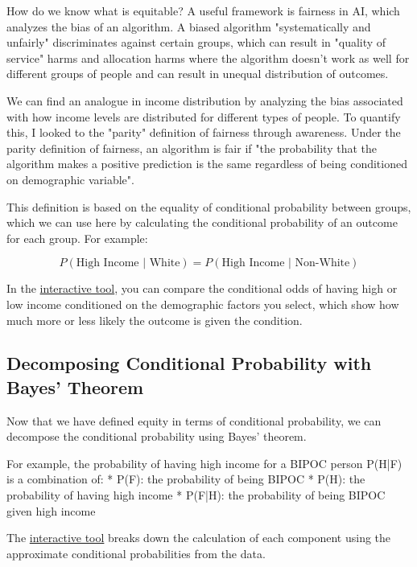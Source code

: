 \documentclass[12pt]{article}
\begin{document}
How do we know what is equitable? A useful framework is fairness in AI, which analyzes the bias of an algorithm. A biased algorithm "systematically and unfairly" discriminates against certain groups, which can result in "quality of service" harms and allocation harms where the algorithm doesn't work as well for different groups of people and can result in unequal distribution of outcomes.\cite{creel}

We can find an analogue in income distribution by analyzing the bias associated with how income levels are distributed for different types of people. To quantify this, I looked to the "parity" definition of fairness through awareness. Under the parity definition of fairness, an algorithm is fair if "the probability that the algorithm makes a positive prediction is the same regardless of being conditioned on demographic variable".\cite{piech:fair}

This definition is based on the equality of conditional probability between groups, which we can use here by calculating the conditional probability of an outcome for each group. For example:

$$P(\text{High Income | White}) = P(\text{High Income | Non-White})$$

In the \href{https://observablehq.com/d/b1dfcf5fca53a8b2#cell-1189}{interactive tool}, you can compare the conditional odds of having high or low income conditioned on the demographic factors you select, which show  how much more or less likely the outcome is given the condition.\cite[p.~70]{ross}

\subsection*{Decomposing Conditional Probability with Bayes' Theorem}

Now that we have defined equity in terms of conditional probability, we can decompose the conditional probability using Bayes' theorem.\cite{piech:bayes} 

For example, the probability of having high income for a BIPOC person P(H|F) is a combination of: 
* P(F): the probability of being BIPOC
* P(H): the probability of having high income
* P(F|H): the probability of being BIPOC given high income

The \href{https://observablehq.com/d/b1dfcf5fca53a8b2#cell-373}{interactive tool} breaks down the calculation of each component using the approximate conditional probabilities from the data.
\end{document}
